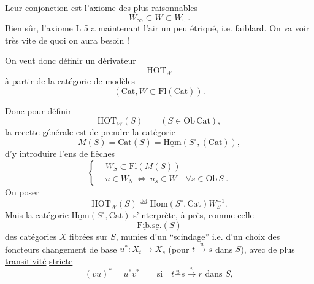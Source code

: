 Leur conjonction est l'axiome des plus raisonnables
\[
W_\infty\subset W\subset W_0\ .
\]
Bien sûr, l'axiome L 5 a maintenant l'air un
peu étriqué, i.e. faiblard. On va voir très vite de
quoi on aura besoin ! 

On veut donc définir un dérivateur
\[
\mathrm{HOT}_W
\]
à partir de la catégorie de modèles
\[
(\mathrm{Cat},W\subset\mathrm{Fl}(\mathrm{Cat})).
\]

Donc pour définir
\[
\mathrm{HOT}_W(S)\qquad (S\in\mathrm{Ob}\,\mathrm{Cat}),
\]
la recette générale est de prendre la catégorie
\[
M(S)=\mathrm{Cat}(S)=\underline{\mathrm{Hom}}(S^\circ,(\mathrm{Cat})),
\]
d'y introduire l'ens de flèches
\[
\left\{\begin{aligned}
&W_S\subset\mathrm{Fl}(M(S))\\
&u\in W_S\ \Longleftrightarrow\ u_s\in W\quad\forall s\in\mathrm{Ob}\,S\ .
\end{aligned}\right.
\]
On  poser
\[
\mathrm{HOT}_W(S)\overset{\mathrm{def}}{=}\underline{\mathrm{Hom}}(S^\circ,\mathrm{Cat})W_S^{-1}.
\]
Mais la catégorie $\underline{\mathrm{Hom}}(S^\circ,\mathrm{Cat})$ s'interprète,
à   près, comme celle
\[
\underline{\mathrm{Fib.}}\underline{\mathrm{sc.}}(S)
\]
des catégories $X$  fibrées sur $S$, munies
d'un ``scindage'' i.e. d'un choix des foncteurs
changement de base $u^*:X_t\longrightarrow X_s$ (pour $t\xrightarrow{u}s$
dans $S$), avec de plus \uline{transitivité} \uline{stricte}
\[
(vu)^*=u^*v^*\qquad\text{si}\quad t\mathrel{\overset{u}{-}}s\xrightarrow{v}r\text{ dans }S,
\]
